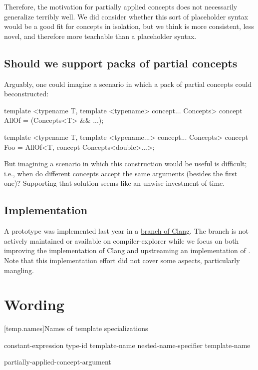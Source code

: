 \documentclass{wg21}
\begin{document}
Therefore, the motivation for partially applied concepts does not necessarily generalize terribly well.
We did consider whether this sort of placeholder syntax would be a good fit for concepts in isolation, but
we think  is more consistent, less novel, and
therefore more teachable than a placeholder syntax.

\subsection{Should we support packs of partial concepts}

Arguably, one could imagine a scenario in which a pack of partial concepts could be\linebreak[4] \mbox{constructed}:

\begin{colorblock}
template <typename T, template <typename> concept... Concepts>
concept AllOf  = (Concepts<T> && ...);

template <typename T, template <typename...> concept... Concepts>
concept Foo = AllOf<T, concept Concepts<double>...>;
\end{colorblock}

But imagining a scenario in which this construction would be useful is difficult; i.e., when do different concepts accept the same arguments (besides the first one)?
Supporting that solution seems like an unwise investment of time.


\subsection{Implementation}

A prototype was implemented last year in a \href{https://github.com/cor3ntin/llvm-project/commit/7fb869e9b6571629258081674de03279ad60ffd3}{branch of Clang}. The branch is not actively maintained or available on compiler-explorer while we focus on both improving the implementation of Clang and upstreaming an implementation of .
Note that this implementation effort did not cover some aspects, particularly mangling.

\section{Wording}

[temp.names]{Names of template specializations}


\begin{bnf}
\br
constant-expression\br
type-id\br
{} template-name\br
nested-name-specifier  template-name\br
\begin{addedblock}
partially-applied-concept-argument
\end{addedblock}
\end{bnf}
\end{document}
